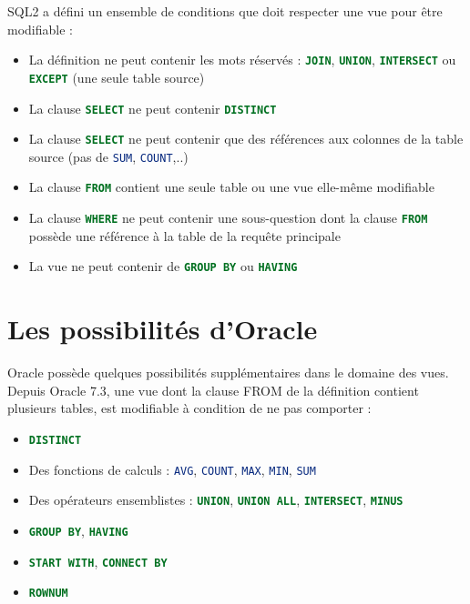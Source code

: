 \documentclass[10pt]{beamer}
\begin{document}
\begin{frame}{\secname}
    SQL2 a défini un ensemble de conditions que doit respecter une vue pour être modifiable :
    \begin{itemize}
        \item La définition ne peut contenir les mots réservés : \lstinline[language=sql]!JOIN!, \lstinline[language=sql]!UNION!, \lstinline[language=sql]!INTERSECT! ou \lstinline[language=sql]!EXCEPT! (une seule table source)
        \item La clause \lstinline[language=sql]!SELECT! ne peut contenir \lstinline[language=sql]!DISTINCT!
        \item La clause \lstinline[language=sql]!SELECT! ne peut contenir que des références aux colonnes de la table source (pas de \lstinline[language=sql]!SUM!, \lstinline[language=sql]!COUNT!,..)
        \item La clause \lstinline[language=sql]!FROM! contient une seule table ou une vue elle-même modifiable
        \item La clause \lstinline[language=sql]!WHERE! ne peut contenir une sous-question dont la clause \lstinline[language=sql]!FROM! possède une référence à la table de la requête principale
        \item La vue ne peut contenir de \lstinline[language=sql]!GROUP BY! ou \lstinline[language=sql]!HAVING!
    \end{itemize}
\end{frame}

\section{Les possibilités d'Oracle}
\begin{frame}{\secname}
    Oracle possède quelques possibilités supplémentaires dans le domaine des vues.
    Depuis Oracle 7.3, une vue dont la clause FROM de la définition contient plusieurs tables, est modifiable à condition de ne pas comporter :

    \begin{itemize}
        \item \lstinline[language=sql]!DISTINCT!
        \item Des fonctions de calculs : \lstinline[language=sql]!AVG!, \lstinline[language=sql]!COUNT!, \lstinline[language=sql]!MAX!, \lstinline[language=sql]!MIN!, \lstinline[language=sql]!SUM!
        \item Des opérateurs ensemblistes : \lstinline[language=sql]!UNION!, \lstinline[language=sql]!UNION ALL!, \lstinline[language=sql]!INTERSECT!, \lstinline[language=sql]!MINUS!
        \item \lstinline[language=sql]!GROUP BY!, \lstinline[language=sql]!HAVING!
        \item \lstinline[language=sql]!START WITH!, \lstinline[language=sql]!CONNECT BY!
        \item \lstinline[language=sql]!ROWNUM!
    \end{itemize}
\end{frame}
\end{document}
